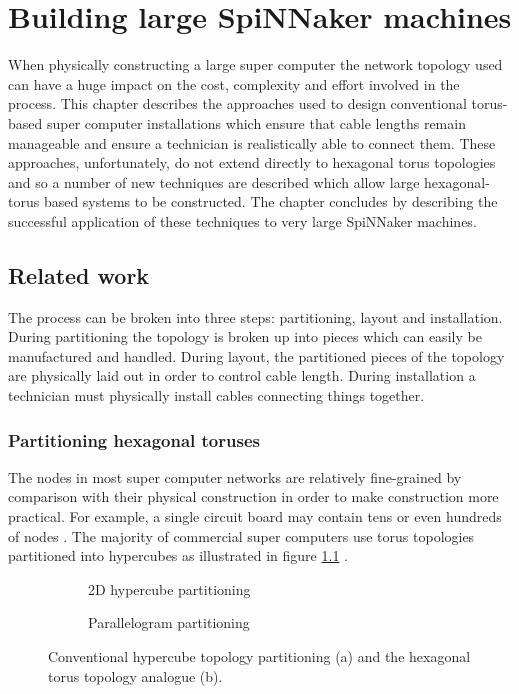 \chapter{Building large SpiNNaker machines}
	
	When physically constructing a large super computer the network topology used
	can have a huge impact on the cost, complexity and effort involved in the
	process. This chapter describes the approaches used to design conventional
	torus-based super computer installations which ensure that cable lengths
	remain manageable and ensure a technician is realistically able to connect
	them. These approaches, unfortunately, do not extend directly to hexagonal
	torus topologies and so a number of new techniques are described which allow
	large hexagonal-torus based systems to be constructed. The chapter concludes
	by describing the successful application of these techniques to very large
	SpiNNaker machines.
	
	\section{Related work}
		
		The process can be broken into three steps: partitioning, layout and
		installation. During partitioning the topology is broken up into pieces
		which can easily be manufactured and handled. During layout, the
		partitioned pieces of the topology are physically laid out in order to
		control cable length. During installation a technician must physically
		install cables connecting things together.
		
		\subsection{Partitioning hexagonal toruses}
			
			The nodes in most super computer networks are relatively fine-grained by
			comparison with their physical construction in order to make construction
			more practical. For example, a single circuit board may contain tens or
			even hundreds of nodes \cite{gilge14,ajima12}. The majority of commercial
			super computers use torus topologies partitioned into hypercubes as
			illustrated in figure \ref{fig:hypercube-partitioning}
			\cite{chen11,ajima12}.
			
			\begin{figure}
				\center
				\begin{subfigure}[b]{0.45\textwidth}
					\center
					
					\caption{2D hypercube partitioning}
					\label{fig:hypercube-partitioning}
				\end{subfigure}
				\begin{subfigure}[b]{0.45\textwidth}
					\center
					
					\caption{Parallelogram partitioning}
					\label{fig:parallelogram-partitioning}
				\end{subfigure}
				
				\caption{Conventional hypercube topology partitioning (a) and the
				hexagonal torus topology analogue (b).}
				\label{fig:partitioning-options}
			\end{figure}
			
